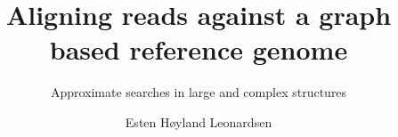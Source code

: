 \documentclass[UKenglish]{ifimaster}
\title{Aligning reads against a graph based reference genome}
\subtitle{Approximate searches in large and complex structures}
\author{Esten H{\o}yland Leonardsen}
\theoremstyle{break}
\begin{document}
\ififorside{}
\frontmatter{}
\maketitle{}


               

\tableofcontents{}
\listoffigures{}
\listoftables{}
\listoftheorems[ignoreall,show={defn}]

\mainmatter{}








\nocite{*}
\printbibliography
\begin{appendices}




\end{appendices}
\backmatter{}
\end{document}
